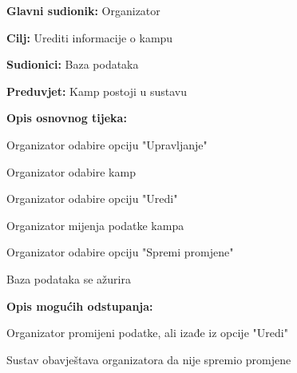 					\noindent {}
					\begin{packed_item}
						
						\item \textbf{Glavni sudionik: } Organizator
						\item  \textbf{Cilj:} Urediti informacije o kampu
						\item  \textbf{Sudionici:} Baza podataka
						\item  \textbf{Preduvjet:} Kamp postoji u sustavu
						\item  \textbf{Opis osnovnog tijeka:}
						
						\item[] \begin{packed_enum}
								
							\item Organizator odabire opciju "Upravljanje"
							\item Organizator odabire kamp
							\item Organizator odabire opciju "Uredi"
							\item Organizator mijenja podatke kampa
							\item Organizator odabire opciju "Spremi promjene"
							\item Baza podataka se ažurira
						\end{packed_enum}
						
						\item  \textbf{Opis mogućih odstupanja:}
						
						\item[] \begin{packed_item}
							
							\item[5.a] Organizator promijeni podatke, ali izađe iz opcije "Uredi"
							\item[] \begin{packed_enum}
								
								\item Sustav obavještava organizatora da nije spremio promjene
								
							\end{packed_enum}
	
							
						\end{packed_item}
					\end{packed_item}
				
